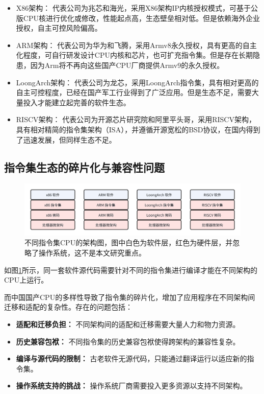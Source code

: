 \documentclass{Style/ucasproposal}%
\begin{document}
    \begin{itemize}
    \item {X86架构： } 代表公司为兆芯和海光，采用X86架构IP内核授权模式，可基于公版CPU核进行优化或修改，性能起点高，生态壁垒相对低。但是依赖海外企业授权，自主可控风险偏高。
    
    \item{ARM架构：} 代表公司为华为和飞腾，采用Armv8永久授权，具有更高的自主化程度，可自行研发设计CPU内核和芯片，也可扩充指令集。但是存在长期隐患，因为Arm将不再向这些国产CPU厂商提供Armv9的永久授权。
    
    \item{LoongArch架构：} 代表公司为龙芯，采用LoongArch指令集，具有相对更高的自主可控程度，已经在国产军工行业得到了广泛应用。但是生态不足，需要大量投入才能建立起完善的软件生态。
    
    \item{RISCV架构：} 代表公司为开源芯片研究院和阿里平头哥，采用RISCV架构，具有相对精简的指令集架构（ISA），并遵循开源宽松的BSD协议，在国内得到了迅速发展，但同样生态不足。
    \end{itemize}


\subsection{指令集生态的碎片化与兼容性问题}

\begin{figure}[h]
    \centering
    \includegraphics[width=1\linewidth]{./feishuImage/allCPU_arch.png}
    \caption{不同指令集CPU的架构图，图中白色为软件层，红色为硬件层，并忽略了操作系统，这不是本文研究重点。\protect\footnotemark}
    \label{img:allCPU_arch}
  \end{figure}


如图\ref{img:allCPU_arch}所示，同一套软件源代码需要针对不同的指令集进行编译才能在不同架构的CPU上运行。

    而中国国产CPU的多样性导致了指令集的碎片化，增加了应用程序在不同架构间迁移和适配的复杂性。存在的问题包括：
    \begin{itemize}
    \item \textbf{适配和迁移负担：} 不同架构间的适配和迁移需要大量人力和物力资源。
    
    \item \textbf{历史兼容包袱：} 不同指令集的历史兼容包袱使得跨架构的兼容性复杂。
    
    \item \textbf{编译与源代码的限制：} 古老软件无源代码，只能通过翻译运行以适应新的指令集。
    
    \item \textbf{操作系统支持的挑战：} 操作系统厂商需要投入更多资源以支持不同架构。
    \end{itemize}
\end{document}
